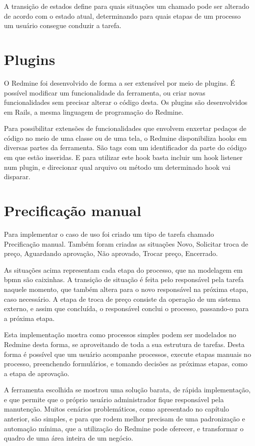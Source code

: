 A transição de estados define para quais situações um chamado pode ser alterado de acordo com o estado atual, determinando para quais etapas de um processo um usuário consegue conduzir a tarefa.

\section{Plugins}\label{sec:redmine-plugins}
O Redmine foi desenvolvido de forma a ser extensível por meio de plugins. É possível modificar um funcionalidade da ferramenta, ou criar novas funcionalidades sem precisar alterar o código desta. Os plugins são desenvolvidos em Rails, a mesma linguagem de programação do Redmine. 

Para possibilitar extensões de funcionalidades que envolvem enxertar pedaços de código no meio de uma classe ou de uma tela, o Redmine disponibiliza hooks em diversas partes da ferramenta. São tags com um identificador da parte do código em que estão inseridas. E para utilizar este hook basta incluir um hook listener num plugin, e direcionar qual arquivo ou método um determinado hook vai disparar.

\section{Precificação manual}\label{sec:redmine-impl-caso-uso}

Para implementar o caso de uso foi criado um tipo de tarefa chamado Precificação manual. Também foram criadas as situações Novo, Solicitar troca de preço, Aguardando aprovação, Não aprovado, Trocar preço, Encerrado.

As situações acima representam cada etapa do processo, que na modelagem em bpmn são caixinhas. A transição de situação é feita pelo responsável pela tarefa naquele momento, que também altera para o novo responsável na próxima etapa, caso necessário. A etapa de troca de preço consiste da operação de um sistema externo, e assim que concluída, o responsável conclui o processo, passando-o para a próxima etapa.

Esta implementação mostra como processos simples podem ser modelados no Redmine desta forma, se aproveitando de toda a sua estrutura de tarefas. Desta forma é possível que um usuário acompanhe processos, execute etapas manuais no processo, preenchendo formulários, e tomando decisões as próximas etapas, como a etapa de aprovação.

A ferramenta escolhida se mostrou uma solução barata, de rápida implementação, e que permite que o próprio usuário administrador fique responsável pela manutenção. Muitos cenários problemáticos, como apresentado no capítulo anterior, são simples, e para que rodem melhor precisam de uma padronização e automação mínima, que a utilização do Redmine pode oferecer, e transformar o quadro de uma área inteira de um negócio.

